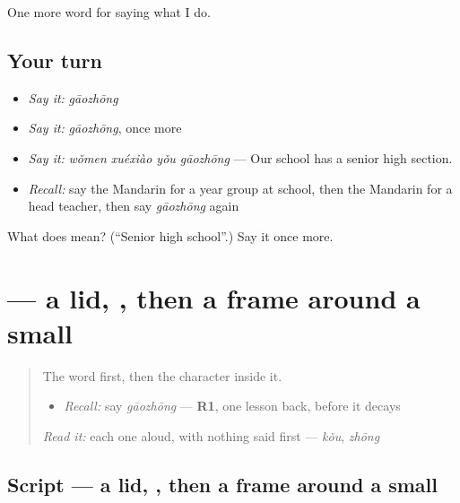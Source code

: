 \begin{grammarlens}[title={What you've built}]
One more word for saying what I do.
\end{grammarlens}

\subsection*{Your turn}
\begin{itemize}
\raggedright
  \item \emph{Say it:} \emph{gāozhōng}
  \item \emph{Say it:} \emph{gāozhōng}, once more
  \item \emph{Say it:} \emph{wǒmen xuéxiào yǒu gāozhōng} — Our school has a senior high section.
  \item \emph{Recall:} say the Mandarin for a year group at school, then the Mandarin for a head teacher, then say \emph{gāozhōng} again
\end{itemize}

\begin{tcolorbox}[breakable,colback=teal!4,colframe=teal!35!black,title={Before you move on}]
What does  mean? (\textquotedblleft{}Senior high school\textquotedblright{}.) Say it once more.
\end{tcolorbox}
\section[\texorpdfstring{\zh{高} (gāo)}{高 (gāo)}]{ — a lid, , then a frame around a small }

\label{lesson:ZH-W248-gao-tall}



\begin{quote}
The word first, then the character inside it.

\begin{itemize}
\raggedright
  \item \emph{Recall:} say \emph{gāozhōng} — \textbf{R1}, one lesson back, before it decays
\end{itemize}

\begin{quote}
 
\end{quote}

\emph{Read it:} each one aloud, with nothing said first — \emph{kǒu}, \emph{zhōng}
\end{quote}

\subsection*{Script — a lid, , then a frame around a small }

